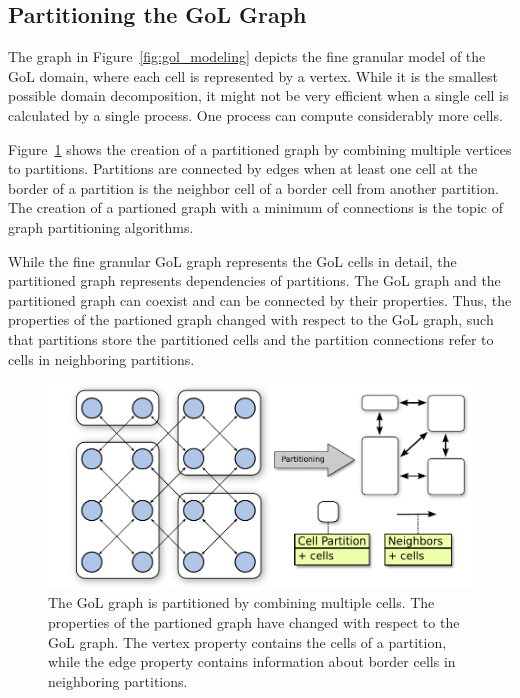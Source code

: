 \subsection{Partitioning the GoL Graph}
The graph in Figure~\ref{fig:gol_modeling} depicts the fine granular
model of the GoL domain, where each cell is represented by a vertex.
While it is the smallest possible domain decomposition, it might not
be very efficient when a single cell is calculated by a single
process. One process can compute considerably more cells.

Figure~\ref{fig:gol_bundle} shows the creation of a partitioned graph
by combining multiple vertices to partitions. Partitions are connected
by edges when at least one cell at the border of a partition is the
neighbor cell of a border cell from another partition.  The creation
of a partioned graph with a minimum of connections is the topic of
graph partitioning algorithms.

While the fine granular GoL graph represents the GoL cells in detail,
the partitioned graph represents dependencies of partitions. The GoL
graph and the partitioned graph can coexist and can be connected by
their properties. Thus, the properties of the partioned graph changed
with respect to the GoL graph, such that partitions store the
partitioned cells and the partition connections refer to cells in
neighboring partitions.

\begin{figure}[H]
  \centering \includegraphics[width=\textwidth]{graphics/30_gol_bundle}
  \caption{The GoL graph is partitioned by combining multiple
    cells. The properties of the partioned graph have changed with
    respect to the GoL graph. The vertex property contains the cells
    of a partition, while the edge property contains information about
    border cells in neighboring partitions.}
  \label{fig:gol_bundle}
\end{figure}

